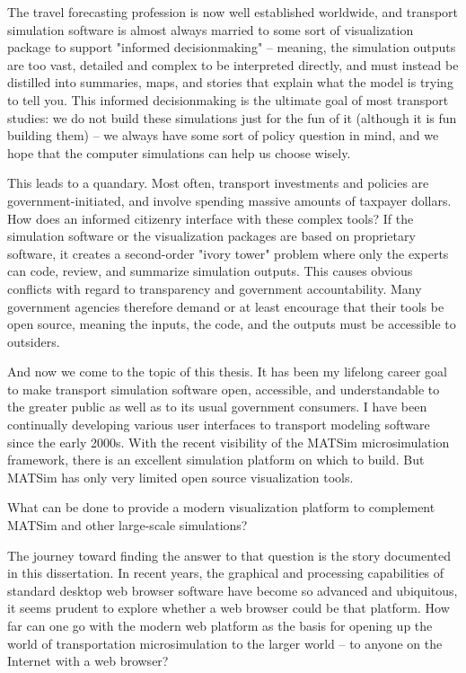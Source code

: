 The travel forecasting profession is now well established worldwide, and transport simulation software is almost always married to some sort of visualization package to support "informed decisionmaking" -- meaning, the simulation outputs are too vast, detailed and complex to be interpreted directly, and must instead be distilled into summaries, maps, and stories that explain what the model is trying to tell you. This informed decisionmaking is the ultimate goal of most transport studies: we do not build these simulations just for the fun of it (although it is fun building them) -- we always have some sort of policy question in mind, and we hope that the computer simulations can help us choose wisely.

This leads to a quandary. Most often, transport investments and policies are government-initiated, and involve spending massive amounts of taxpayer dollars. How does an informed citizenry interface with these complex tools? If the simulation software or the visualization packages are based on proprietary software, it creates a second-order "ivory tower" problem where only the experts can code, review, and summarize simulation outputs. This causes obvious conflicts with regard to transparency and government accountability. Many government agencies therefore demand or at least encourage that their tools be open source, meaning the inputs, the code, and the outputs must be accessible to outsiders.

And now we come to the topic of this thesis. It has been my lifelong career goal to make transport simulation software open, accessible, and understandable to the greater public as well as to its usual government consumers. I have been continually developing various user interfaces to transport modeling software since the early 2000s. With the recent visibility of the \gls{MATSim} microsimulation framework, there is an excellent simulation platform on which to build. But MATSim has only very limited open source visualization tools.

What can be done to provide a modern visualization platform to complement MATSim and other large-scale simulations?

The journey toward finding the answer to that question is the story documented in this dissertation. In recent years, the graphical and processing capabilities of standard desktop web browser software have become so advanced and ubiquitous, it seems prudent to explore whether a web browser could be that platform. How far can one go with the modern web platform as the basis for opening up the world of transportation microsimulation to the larger world -- to anyone on the Internet with a web browser?


